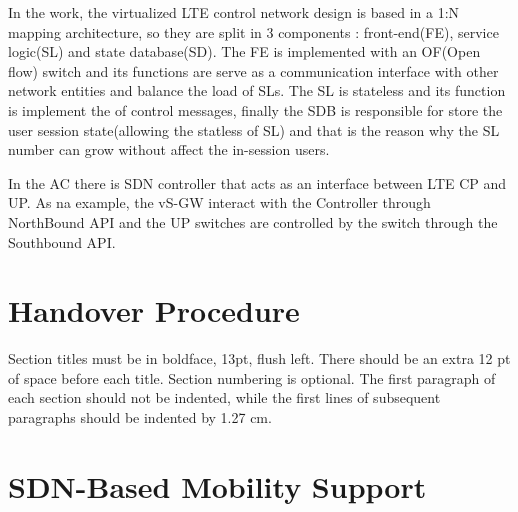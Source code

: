 \documentclass[12pt]{article}
\begin{document}
In the work, the virtualized LTE control network design is based in a 1:N mapping architecture, so they are split in 3 components : front-end(FE), service logic(SL) and state database(SD). The FE is implemented with an OF(Open flow)	switch and its functions are serve as a communication interface with other network entities and balance the load of SLs. The SL is stateless and its function is implement the of control messages, finally the SDB is responsible for store the user session state(allowing the statless of SL) and that is the reason why the SL number can grow without affect the in-session users.

In the AC there is SDN controller that acts as an interface between LTE CP and UP. As na example, the vS-GW interact with the Controller through NorthBound API and the UP switches are controlled by the switch through the Southbound API.

\section{Handover Procedure}

Section titles must be in boldface, 13pt, flush left. There should be an extra
12 pt of space before each title. Section numbering is optional. The first
paragraph of each section should not be indented, while the first lines of
subsequent paragraphs should be indented by 1.27 cm.

\section{SDN-Based Mobility Support}
\end{document}
